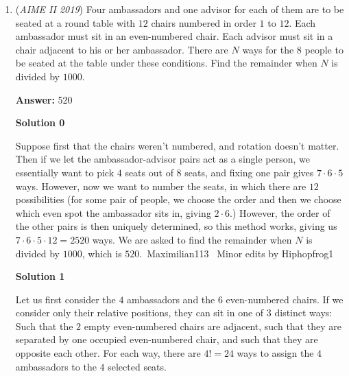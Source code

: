 \begin{enumerate}
 To filter out the desired coefficients, apply Roots of Unity filter 3 times. Filter out the coefficients with even $a$ multiplicity using 
 \[\frac{f(1, b, c)+f(-1, b, c)}{2}=\frac{(3+2b+c)^4+(c+1)^4}{2}=g(b,c).\] Similarly, now filter out the coefficients with even $b$ multiplicity with 
 \[\frac{g(1, c)+g(-1, c)}{2}=\frac{(c+5)^4+3(c+1)^4}{4}=h(c).\] Apply this one more time to get 
 \[\frac{h(1)+h(-1)}{2}=\frac{6^4+3(2)^4+4^4}{8}.\] The requested probability is $\frac{6^4+3(2)^4+4^4}{8\cdot 6^4}=\frac{25}{162} \implies \boxed{187}.$



	\item (\textit{AIME II 2019}) Four ambassadors and one advisor for each of them are to be seated at a round table with $12$ chairs numbered in order $1$ to $12$. Each ambassador must sit in an even-numbered chair. Each advisor must sit in a chair adjacent to his or her ambassador. There are $N$ ways for the $8$ people to be seated at the table under these conditions. Find the remainder when $N$ is divided by $1000$.


 
 \textbf{Answer: }520



\textbf{Solution 0}

Suppose first that the chairs weren't numbered, and rotation doesn't matter. Then if we let the ambassador-advisor pairs act as a single person, we essentially want to pick $4$ seats out of $8$ seats, and fixing one pair gives $7 \cdot 6 \cdot 5$ ways. However, now we want to number the seats, in which there are $12$ possibilities (for some pair of people, we choose the order and then we choose which even spot the ambassador sits in, giving $2\cdot 6.$) However, the order of the other pairs is then uniquely determined, so this method works, giving us $7 \cdot 6 \cdot 5 \cdot 12 = 2520$ ways. We are asked to find the remainder when $\textit{N}$ is divided by $1000$, which is $\boxed{520}$.~Maximilian113 ~Minor edits by Hiphopfrog1

 



\textbf{Solution 1}

Let us first consider the $4$ ambassadors and the $6$ even-numbered chairs. If we consider only their relative positions, they can sit in one of $3$ distinct ways: Such that the $2$ empty even-numbered chairs are adjacent, such that they are separated by one occupied even-numbered chair, and such that they are opposite each other. For each way, there are $4!=24$ ways to assign the $4$ ambassadors to the $4$ selected seats.


\end{enumerate}
